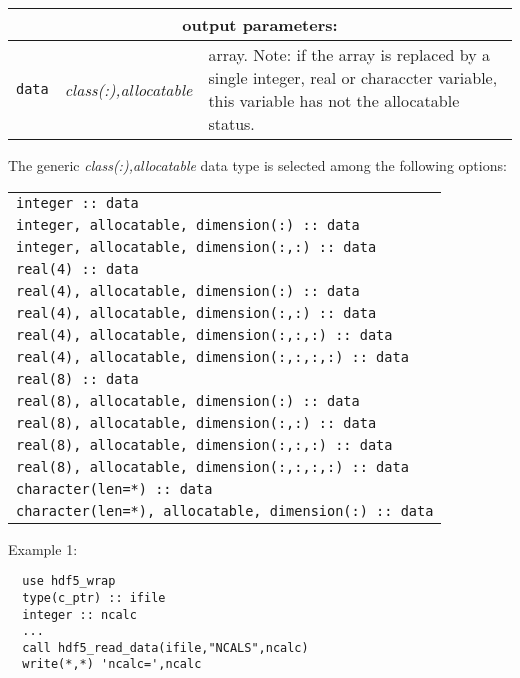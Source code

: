 \noindent
\begin{tabular}{|p{1.5cm}|p{3.5cm}|p{9.5cm}|}
\hline
\multicolumn{3}{|c|}{\bf output parameters:} \\
\hline
{\tt data} & {\it class(:),allocatable} & array. Note: if the array is replaced by a single integer, real or characcter variable,
this variable has not the allocatable status.\\
\hline
\end{tabular}

\vskip 0.5cm

\noindent The generic {\it class(:),allocatable} data type is selected among the following options:

\vskip 0.2cm
\begin{tabular}{|p{10.5cm}|}
\hline
{\tt integer  :: data} \\
{\tt integer, allocatable, dimension(:) :: data} \\
{\tt integer, allocatable, dimension(:,:) :: data} \\
{\tt real(4) :: data} \\
{\tt real(4), allocatable, dimension(:) :: data} \\
{\tt real(4), allocatable, dimension(:,:) :: data} \\
{\tt real(4), allocatable, dimension(:,:,:) :: data} \\
{\tt real(4), allocatable, dimension(:,:,:,:) :: data} \\
{\tt real(8) :: data} \\
{\tt real(8), allocatable, dimension(:) :: data} \\
{\tt real(8), allocatable, dimension(:,:) :: data} \\
{\tt real(8), allocatable, dimension(:,:,:) :: data} \\
{\tt real(8), allocatable, dimension(:,:,:,:) :: data} \\
{\tt character(len=*) :: data} \\
{\tt character(len=*), allocatable, dimension(:) :: data} \\
\hline
\end{tabular}

\vskip 0.4cm
\goodbreak

\noindent Example 1:
\begin{verbatim}
  use hdf5_wrap
  type(c_ptr) :: ifile
  integer :: ncalc
  ...
  call hdf5_read_data(ifile,"NCALS",ncalc)
  write(*,*) 'ncalc=',ncalc
\end{verbatim}

\vskip 0.3cm

